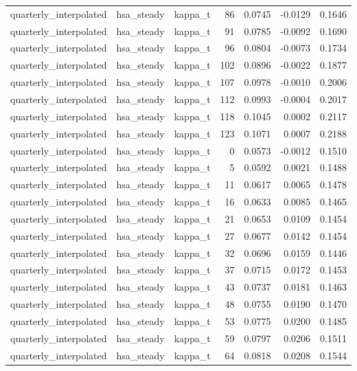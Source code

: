 \begin{tabular}{lllrrrr}
quarterly\_interpolated & hsa\_steady & kappa\_t & 86 & 0.0745 & -0.0129 & 0.1646 \\
quarterly\_interpolated & hsa\_steady & kappa\_t & 91 & 0.0785 & -0.0092 & 0.1690 \\
quarterly\_interpolated & hsa\_steady & kappa\_t & 96 & 0.0804 & -0.0073 & 0.1734 \\
quarterly\_interpolated & hsa\_steady & kappa\_t & 102 & 0.0896 & -0.0022 & 0.1877 \\
quarterly\_interpolated & hsa\_steady & kappa\_t & 107 & 0.0978 & -0.0010 & 0.2006 \\
quarterly\_interpolated & hsa\_steady & kappa\_t & 112 & 0.0993 & -0.0004 & 0.2017 \\
quarterly\_interpolated & hsa\_steady & kappa\_t & 118 & 0.1045 & 0.0002 & 0.2117 \\
quarterly\_interpolated & hsa\_steady & kappa\_t & 123 & 0.1071 & 0.0007 & 0.2188 \\
quarterly\_interpolated & hsa\_steady & kappa\_t & 0 & 0.0573 & -0.0012 & 0.1510 \\
quarterly\_interpolated & hsa\_steady & kappa\_t & 5 & 0.0592 & 0.0021 & 0.1488 \\
quarterly\_interpolated & hsa\_steady & kappa\_t & 11 & 0.0617 & 0.0065 & 0.1478 \\
quarterly\_interpolated & hsa\_steady & kappa\_t & 16 & 0.0633 & 0.0085 & 0.1465 \\
quarterly\_interpolated & hsa\_steady & kappa\_t & 21 & 0.0653 & 0.0109 & 0.1454 \\
quarterly\_interpolated & hsa\_steady & kappa\_t & 27 & 0.0677 & 0.0142 & 0.1454 \\
quarterly\_interpolated & hsa\_steady & kappa\_t & 32 & 0.0696 & 0.0159 & 0.1446 \\
quarterly\_interpolated & hsa\_steady & kappa\_t & 37 & 0.0715 & 0.0172 & 0.1453 \\
quarterly\_interpolated & hsa\_steady & kappa\_t & 43 & 0.0737 & 0.0181 & 0.1463 \\
quarterly\_interpolated & hsa\_steady & kappa\_t & 48 & 0.0755 & 0.0190 & 0.1470 \\
quarterly\_interpolated & hsa\_steady & kappa\_t & 53 & 0.0775 & 0.0200 & 0.1485 \\
quarterly\_interpolated & hsa\_steady & kappa\_t & 59 & 0.0797 & 0.0206 & 0.1511 \\
quarterly\_interpolated & hsa\_steady & kappa\_t & 64 & 0.0818 & 0.0208 & 0.1544 \\

\end{tabular}
